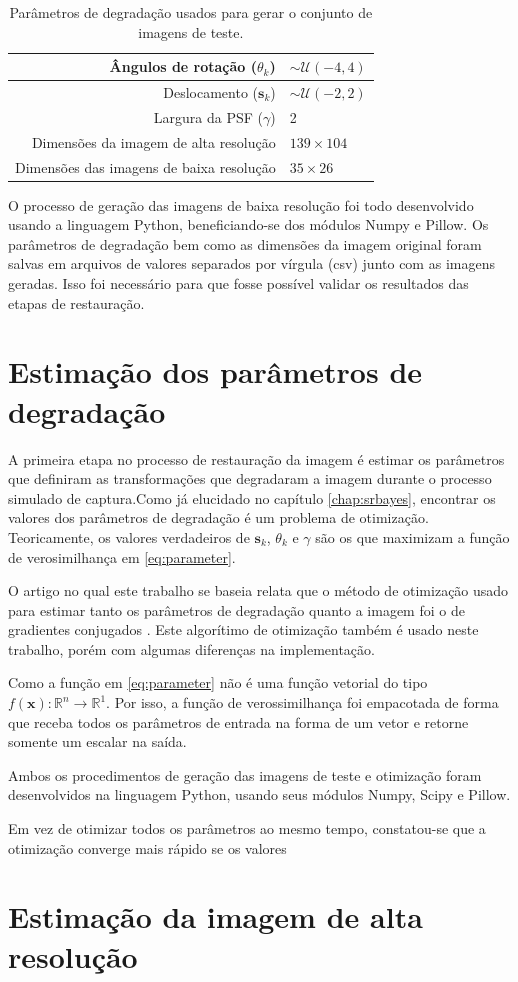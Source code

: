 \begin{table}[h]
	\centering
	\caption{Parâmetros de degradação usados para gerar o conjunto de imagens de teste.}
	\label{tab:resumoParametros}
	\begin{tabular}{r | l}
		Ângulos de rotação ($\theta_k$) & $ \sim \mathcal{U}(-4, 4)$ \\ \hline
		Deslocamento ($\mathbf{s}_k$)& $\sim \mathcal{U}(-2,2)$\\ \hline
		Largura da PSF ($\gamma$) & 2 \\ \hline
		Dimensões da imagem de alta resolução & $139 \times 104$ \\ \hline
		Dimensões das imagens de baixa resolução & $35 \times 26$ \\

	\end{tabular}
\end{table}

O processo de geração das imagens de baixa resolução foi todo desenvolvido usando a linguagem Python,
beneficiando-se dos módulos Numpy e Pillow.
Os parâmetros de degradação bem como as dimensões da imagem original foram salvas em arquivos de valores separados por vírgula (csv) junto com as imagens geradas.
Isso foi necessário para que fosse possível validar os resultados das etapas de restauração.

\section{Estimação dos parâmetros de degradação}
\label{sec:parestimation}
A primeira etapa no processo de restauração da imagem é estimar os parâmetros que definiram as transformações que degradaram a imagem durante o processo simulado de captura.Como já elucidado no capítulo \ref{chap:srbayes}, encontrar os valores dos parâmetros de degradação é um problema de otimização.
Teoricamente, os valores verdadeiros de $\mathbf{s}_k$, $\theta_k$ e $\gamma$ são os que maximizam a função de verosimilhança em \ref{eq:parameter}.

O artigo no qual este trabalho se baseia relata que o método de otimização usado para estimar tanto os parâmetros de degradação quanto a imagem foi o de gradientes conjugados \cite{tipping2003bayesian}.
Este algorítimo de otimização também é usado neste trabalho, porém com algumas diferenças na implementação.

Como a função em \ref{eq:parameter} não é uma função vetorial do tipo $ f(\mathbf{x}) : \mathbb{R}^n \to \mathbb{R}^1 $.
Por isso, a função de verossimilhança foi empacotada de forma que receba todos os parâmetros de entrada na forma de um vetor e retorne somente um escalar na saída.

Ambos os procedimentos de geração das imagens de teste e otimização foram desenvolvidos na linguagem Python, usando seus módulos Numpy, Scipy e Pillow.

Em vez de otimizar todos os parâmetros ao mesmo tempo,
constatou-se que a otimização converge mais rápido se os valores 

\section{Estimação da imagem de alta resolução}
